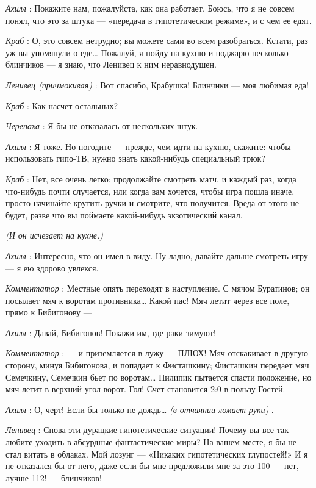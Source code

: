 \documentclass[../main.tex]{subfiles}
\begin{document}
\begin{dialogue}
\emph{Ахилл} : Покажите нам, пожалуйста, как она работает. Боюсь, что я не совсем понял, что это за штука --- «передача в гипотетическом режиме», и с чем ее едят.

\emph{Краб} : О, это совсем нетрудно; вы можете сами во всем разобраться. Кстати, раз уж вы упомянули о еде\ldots{} Пожалуй, я пойду на кухню и поджарю несколько блинчиков --- я знаю, что Ленивец к ним неравнодушен.

\emph{Ленивец (причмокивая)} : Вот спасибо, Крабушка! Блинчики --- моя любимая еда!

\emph{Краб} : Как насчет остальных?

\emph{Черепаха} : Я бы не отказалась от нескольких штук.

\emph{Ахилл} : Я тоже. Но погодите --- прежде, чем идти на кухню, скажите: чтобы использовать гипо-ТВ, нужно знать какой-нибудь специальный трюк?

\emph{Краб} : Нет, все очень легко: продолжайте смотреть матч, и каждый раз, когда что-нибудь почти случается, или когда вам хочется, чтобы игра пошла иначе, просто начинайте крутить ручки и смотрите, что получится. Вреда от этого не будет, разве что вы поймаете какой-нибудь экзотический канал.

\emph{(И он исчезает на кухне.)}

\emph{Ахилл} : Интересно, что он имел в виду. Ну ладно, давайте дальше смотреть игру --- я ею здорово увлекся.

\emph{Комментатор} : Местные опять переходят в наступление. С мячом Буратинов; он посылает мяч к воротам противника\ldots{} Какой пас! Мяч летит через все поле, прямо к Бибигонову ---

\emph{Ахилл} : Давай, Бибигонов! Покажи им, где раки зимуют!

\emph{Комментатор} : --- и приземляется в лужу --- ПЛЮХ! Мяч отскакивает в другую сторону, минуя Бибигонова, и попадает к Фисташкину; Фисташкин передает мяч Семечкину, Семечкин бьет по воротам\ldots{} Пилипик пытается спасти положение, но мяч летит в верхний угол ворот. Гол! Счет становится 2:0 в пользу Гостей.

\emph{Ахилл} : О, черт! Если бы только не дождь\ldots{} \emph{(в отчаянии ломает руки)} .

\emph{Ленивец} : Снова эти дурацкие гипотетические ситуации! Почему вы все так любите уходить в абсурдные фантастические миры? На вашем месте, я бы не стал витать в облаках. Мой лозунг --- «Никаких гипотетических глупостей!» И я не отказался бы от него, даже если бы мне предложили мне за это 100 --- нет, лучше 112! --- блинчиков!


\end{dialogue}
\end{document}
